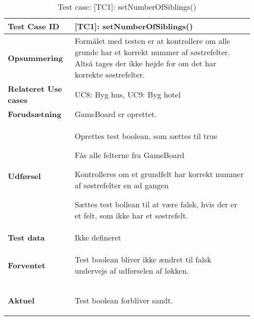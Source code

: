 \documentclass[class=article, crop=false]{standalone}
\makeatletter
\let\savespace\@minipagetrue
\makeatother
\begin{document}
    \begin{table}[H]
        \caption{Test case: [TC1]: setNumberOfSiblings()}
        \begin{tabularx}{\textwidth}{|l|X|}
            \hline
            \textbf{Test Case ID }       & \textbf{[TC1]: setNumberOfSiblings()}   \\ \hline
            \textbf{Opsummering}         & Formålet med testen er at kontrollere om alle grunde har et korrekt nummer af søstrefelter.
                                            Altså tages der ikke højde for om det har korrekte søstrefelter. \\ \hline
            \textbf{Relateret Use cases}     & UC8: Byg hus, UC9: Byg hotel      \\ \hline
            \textbf{Forudsætning}& GameBoard er oprettet.\\ \hline
            \textbf{Udførsel}            & \begin{tabenum}
                                               \item Oprettes test boolean, som sættes til true
                                               \item Fås alle felterne fra GameBoard
                                               \item Kontrolleres om et grundfelt har korrekt nummer af søstrefelter en ad gangen
                                               \item Sættes test bollean til at være falsk, hvis der er et felt, som ikke har et søstrefelt.
            \end{tabenum} \\ \hline
            \textbf{Test data}           &  Ikke defineret
            \end{compactitem}  \\ \hline
            \textbf{Forventet} & \savespace \begin{compactitem}
                                     \item Test boolean bliver ikke ændret til falsk undervejs af udførselen af løkken.
                                     \end{compactitem} \savespace \\    \hline
            \textbf{Aktuel} & \begin{tabenum}
                                  \item Test boolean forbliver sandt.
            \end{tabenum}   \\ \hline

\end{tabularx}
\end{table}
\end{document}
